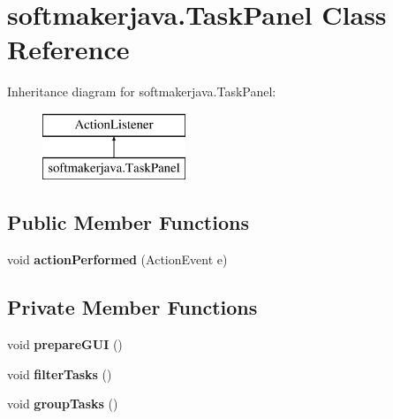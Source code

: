 \hypertarget{classsoftmakerjava_1_1_task_panel}{}\section{softmakerjava.\+Task\+Panel Class Reference}
\label{classsoftmakerjava_1_1_task_panel}
Inheritance diagram for softmakerjava.\+Task\+Panel\+:\begin{figure}[H]
\begin{center}
\leavevmode
\includegraphics[height=2.000000cm]{classsoftmakerjava_1_1_task_panel}
\end{center}
\end{figure}
\subsection*{Public Member Functions}
\begin{DoxyCompactItemize}
\item 
void {\bfseries action\+Performed} (Action\+Event e)\hypertarget{classsoftmakerjava_1_1_task_panel_aec564204f53ff71f7d8f347a5e06287c}{}\label{classsoftmakerjava_1_1_task_panel_aec564204f53ff71f7d8f347a5e06287c}

\end{DoxyCompactItemize}
\subsection*{Private Member Functions}
\begin{DoxyCompactItemize}
\item 
void {\bfseries prepare\+G\+UI} ()\hypertarget{classsoftmakerjava_1_1_task_panel_a8c018ddc0ca0cb57df9cd0313fc97ded}{}\label{classsoftmakerjava_1_1_task_panel_a8c018ddc0ca0cb57df9cd0313fc97ded}

\item 
void {\bfseries filter\+Tasks} ()\hypertarget{classsoftmakerjava_1_1_task_panel_a03f6f39278caf4269caf457b7e6dc072}{}\label{classsoftmakerjava_1_1_task_panel_a03f6f39278caf4269caf457b7e6dc072}

\item 
void {\bfseries group\+Tasks} ()\hypertarget{classsoftmakerjava_1_1_task_panel_a02c79a5bbb164db796f15ab08cdd1f63}{}\label{classsoftmakerjava_1_1_task_panel_a02c79a5bbb164db796f15ab08cdd1f63}

\end{DoxyCompactItemize}
